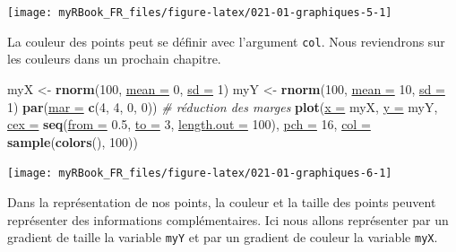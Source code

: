 \documentclass[twoside,symmetric]{book}
\newenvironment{Shaded}{}{}
\newcommand{\CommentTok}[1]{\textit{#1}}
\newcommand{\DataTypeTok}[1]{\underline{#1}}
\newcommand{\DecValTok}[1]{#1}
\newcommand{\FloatTok}[1]{#1}
\newcommand{\KeywordTok}[1]{\textbf{#1}}
\newcommand{\NormalTok}[1]{#1}
\newcommand{\StringTok}[1]{#1}
\begin{document}
\texttt{[image: myRBook\_FR\_files/figure-latex/021-01-graphiques-5-1]}

La couleur des points peut se définir avec l'argument \texttt{col}. Nous reviendrons sur les couleurs dans un prochain chapitre.

\begin{Shaded}
\begin{Highlighting}[]
\NormalTok{myX <-}\StringTok{ }\KeywordTok{rnorm}\NormalTok{(}\DecValTok{100}\NormalTok{, }\DataTypeTok{mean =} \DecValTok{0}\NormalTok{, }\DataTypeTok{sd =} \DecValTok{1}\NormalTok{)}
\NormalTok{myY <-}\StringTok{ }\KeywordTok{rnorm}\NormalTok{(}\DecValTok{100}\NormalTok{, }\DataTypeTok{mean =} \DecValTok{10}\NormalTok{, }\DataTypeTok{sd =} \DecValTok{1}\NormalTok{)}
\KeywordTok{par}\NormalTok{(}\DataTypeTok{mar =} \KeywordTok{c}\NormalTok{(}\DecValTok{4}\NormalTok{, }\DecValTok{4}\NormalTok{, }\DecValTok{0}\NormalTok{, }\DecValTok{0}\NormalTok{)) }\CommentTok{# réduction des marges}
\KeywordTok{plot}\NormalTok{(}\DataTypeTok{x =}\NormalTok{ myX, }\DataTypeTok{y =}\NormalTok{ myY, }
  \DataTypeTok{cex =} \KeywordTok{seq}\NormalTok{(}\DataTypeTok{from =} \FloatTok{0.5}\NormalTok{, }\DataTypeTok{to =} \DecValTok{3}\NormalTok{, }\DataTypeTok{length.out =} \DecValTok{100}\NormalTok{),}
  \DataTypeTok{pch =} \DecValTok{16}\NormalTok{,}
  \DataTypeTok{col =} \KeywordTok{sample}\NormalTok{(}\KeywordTok{colors}\NormalTok{(), }\DecValTok{100}\NormalTok{))}
\end{Highlighting}
\end{Shaded}

\texttt{[image: myRBook\_FR\_files/figure-latex/021-01-graphiques-6-1]}

Dans la représentation de nos points, la couleur et la taille des points peuvent représenter des informations complémentaires. Ici nous allons représenter par un gradient de taille la variable \texttt{myY} et par un gradient de couleur la variable \texttt{myX}.
\end{document}
